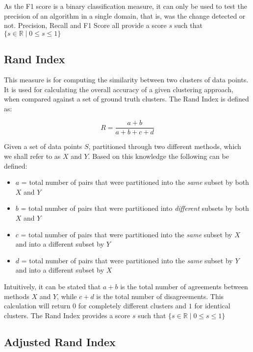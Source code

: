 \documentclass{uvamscse}	%
\begin{document}
	As the F1 score is a binary classification measure, it can only be used to test the precision of an algorithm in a single domain, that is, was the change detected or not. Precision, Recall and F1 Score all provide a score $s$ such that $ \{s\in\mathbb{R} \mid 0\leq s \leq 1\} $

\subsection{Rand Index}

This measure is for computing the similarity between two clusters of data points. It is used for calculating the overall accuracy of a given clustering approach, when compared against a set of ground truth clusters. The Rand Index is defined as:

	\begin{equation}
		R = \frac{a+b}{a+b+c+d}
	\end{equation}
	
	Given a set of data points $S$, partitioned through two different methods, which we shall refer to as $X$ and $Y$. Based on this knowledge the following can be defined:
	
	\begin{itemize}
		\item $a$ = total number of pairs that were partitioned into the \emph{same} subset by both $X$ and $Y$
		\item $b$ = total number of pairs that were partitioned into \emph{different} subsets by both $X$ and $Y$
		\item $c$ = total number of pairs that were partitioned into the \emph{same} subset by $X$ and into a different subset by $Y$
		\item $d$ = total number of pairs that were partitioned into the \emph{same} subset by $Y$ and into a different subset by $X$
	\end{itemize}
	
	Intuitively, it can be stated that $a+b$ is the total number of agreements between methods $X$ and $Y$, while $c+d$ is the total number of disagreements. This calculation will return $0$ for completely different clusters and $1$ for identical clusters. The Rand Index provides a score $s$ such that $ \{s\in\mathbb{R} \mid 0\leq s \leq 1\} $
	
\subsection{Adjusted Rand Index}
	
\end{document}
